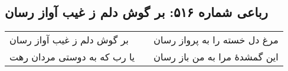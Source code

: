 \begin{center}
\section*{رباعی شماره ۵۱۶: بر گوش دلم ز غیب آواز رسان}
\label{sec:sh516}
\begin{longtable}{l p{0.5cm} r}
بر گوش دلم ز غیب آواز رسان
&&
مرغ دل خسته را به پرواز رسان
\\
یا رب که به دوستی مردان رهت
&&
این گمشدهٔ مرا به من باز رسان
\\
\end{longtable}
\end{center}
